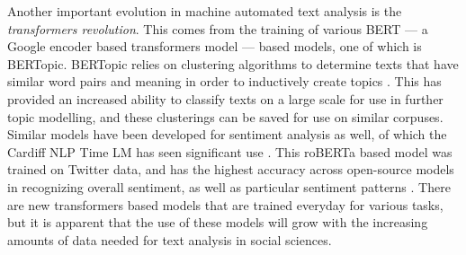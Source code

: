Another important evolution in machine automated text analysis is the \textit{transformers revolution}. This comes from the training of various BERT --- a Google encoder based transformers model --- based models, one of which is BERTopic. BERTopic relies on clustering algorithms to determine texts that have similar word pairs and meaning in order to inductively create topics \Parencite[][p. 2-3]{grootendorst2022bertopic}. This has provided an increased ability to classify texts on a large scale for use in further topic modelling, and these clusterings can be saved for use on similar corpuses. Similar models have been developed for sentiment analysis as well, of which the Cardiff NLP Time LM has seen significant use \parencite*{camacho-collados-etal-2022-tweetnlp}. This roBERTa based model was trained on Twitter data, and has the highest accuracy across open-source models in recognizing overall sentiment, as well as particular sentiment patterns \Parencite[][p. 3-4]{camacho-collados-etal-2022-tweetnlp}. There are new transformers based models that are trained everyday for various tasks, but it is apparent that the use of these models will grow with the increasing amounts of data needed for text analysis in social sciences.

